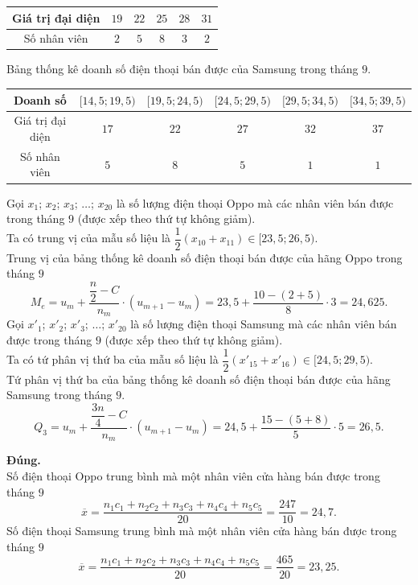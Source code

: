 \begin{ex}
{\begin{center}
\begin{tabular}{|c|c|c|c|c|c|}
				Giá trị đại diện & $19$ & $22$ & $25$ & $28$  & $31$ \\ \hline
				Số nhân  viên & $2$ & $5$ & $8$ & $3$ & $2$ \\
				\hline 
			\end{tabular}
		\end{center}
		Bảng thống  kê doanh số điện thoại bán được của Samsung trong tháng $9$.
		\begin{center}
			\begin{tabular}{|c|c|c|c|c|c|}
				\hline 
				Doanh số & $[14{,}5; 19{,}5)$  & $[19{,}5; 24{,}5)$ & $[24{,}5; 29{,}5)$ & $[29{,}5; 34{,}5)$ & $[34{,}5; 39{,}5)$ \\ \hline
				Giá  trị đại diện & $17$ & $22$ & $27$ & $32$ & $37$ \\ \hline
				Số nhân viên & $5$ & $8$ & $5$ & $1$ & $1$  \\
				 \hline
			\end{tabular}
		\end{center}
		Gọi $x_{1}$; $x_{2}$; $x_{3}$; $\ldots$; $x_{20}$ là số lượng điện thoại Oppo mà các nhân viên bán  được trong tháng $9$ (được xếp theo thứ tự không giảm).\\
		Ta có trung vị của mẫu số  liệu là $\dfrac{1}{2} (x_{10}+x_{11})\in [23{,}5;26{,}5)$.\\
		Trung vị của  bảng thống kê doanh số điện thoại bán được của hãng Oppo trong tháng $9$
		\[M_{e}=u_{m}+\dfrac{\dfrac{n}{2}-C}{n_{m}} \cdot  (u_{m+1}-u_{m})=23{,}5+\dfrac{10-(2+5)}{8} \cdot 3=24{,}625.\]
		Gọi $x'_{1}$; $x'_{2}$; $x'_{3}$; $\ldots$; $x'_{20}$ là số lượng  điện thoại Samsung mà các nhân viên bán được trong tháng $9$ (được xếp theo thứ tự không giảm).\\
		Ta có tứ phân vị  thứ ba của mẫu số liệu là $\dfrac{1}{2} (x'_{15}+x'_{16})\in [24{,}5;29{,}5)$.\\
		Tứ phân vị thứ ba của  bảng thống kê doanh số điện thoại bán được của hãng Samsung trong tháng $9$.
		\[Q_{3}=u_{m}+\dfrac{\dfrac{3n}{4}-C}{n_{m}} \cdot  (u_{m+1}-u_{m})=24{,}5+\dfrac{15-(5+8)}{5} \cdot 5=26{,}5.\]
		\begin{itemchoice}
			\itemch  \textbf{Đúng.}\\
			Số điện thoại Oppo trung bình mà một nhân viên cửa hàng  bán được trong tháng $9$
			\[\overline{x}=\dfrac{n_{1}  c_{1}+n_{2} c_{2}+n_{3} c_{3}+n_{4} c_{4}+n_{5} c_{5}}{20}=\dfrac{247}{10}=24{,}7.\]
			Số điện  thoại Samsung trung bình mà một nhân viên cửa hàng bán được trong tháng $9$
			\[\overline{x}=\dfrac{n_{1} c_{1}+n_{2} c_{2}+n_{3} c_{3}+n_{4} c_{4}+n_{5} c_{5}}{20}=\dfrac{465}{20}=23{,}25.\] 

\end{itemchoice}}
\end{ex}
